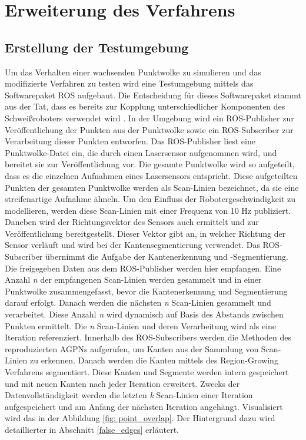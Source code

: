 
\section{Erweiterung des Verfahrens}
\subsection{Erstellung der Testumgebung}
Um das Verhalten einer wachsenden Punktwolke zu simulieren und das modifizierte Verfahren zu testen wird eine Testumgebung mittels das Softwarepaket ROS aufgebaut. Die Entscheidung für dieses Softwarepaket stammt aus der Tat, dass es bereits zur Kopplung unterschiedlicher Komponenten des Schweißroboters verwendet wird \autocite[39]{savla_intelligente_2022}. In der Umgebung wird ein ROS-Publisher zur Veröffentlichung der Punkten aus der Punktwolke sowie ein ROS-Subscriber zur Verarbeitung dieser Punkten entworfen. Das ROS-Publisher liest eine Punktwolke-Datei ein, die durch einen Lasersensor aufgenommen wird, und bereitet sie zur Veröffentlichung vor. Die gesamte Punktwolke wird so aufgeteilt, dass es die einzelnen Aufnahmen eines Lasersensors entspricht. Diese aufgeteilten Punkten der gesamten Punktwolke werden als Scan-Linien bezeichnet, da sie eine streifenartige Aufnahme ähneln. Um den Einfluss der Robotergeschwindigkeit zu modellieren, werden diese Scan-Linien mit einer Frequenz von 10 Hz publiziert. Daneben wird der Richtungsvektor des Sensors auch ermittelt und zur Veröffentlichung bereitgestellt. Dieser Vektor gibt an, in welcher Richtung der Sensor verläuft und wird bei der Kantensegmentierung verwendet. Das ROS-Subscriber übernimmt die Aufgabe der Kantenerkennung und -Segmentierung. Die freigegeben Daten aus dem ROS-Publisher werden hier empfangen. Eine Anzahl \textit{n} der empfangenen Scan-Linien werden gesammelt und in einer Punktwolke zusammengefasst, bevor die Kantenerkennung und Segmentierung darauf erfolgt. Danach werden die nächsten \textit{n} Scan-Linien gesammelt und verarbeitet. Diese Anzahl \textit{n} wird dynamisch auf Basis des Abstands zwischen Punkten ermittelt. Die \textit{n} Scan-Linien und deren Verarbeitung wird als eine Iteration referenziert. Innerhalb des ROS-Subscribers werden die Methoden des reproduzierten AGPNs aufgerufen, um Kanten aus der Sammlung von Scan-Linien zu erkennen. Danach werden die Kanten mittels des Region-Growing Verfahrens segmentiert. Diese Kanten und Segmente werden intern gespeichert und mit neuen Kanten nach jeder Iteration erweitert. Zwecks der Datenvollständigkeit werden die letzten \textit{k} Scan-Linien einer Iteration aufgespeichert und am Anfang der nächsten Iteration angehängt. Visualisiert wird das in der Abbildung \ref{fig: point_overlap}. Der Hintergrund dazu wird detaillierter in Abschnitt \ref{false_edges} erläutert.

